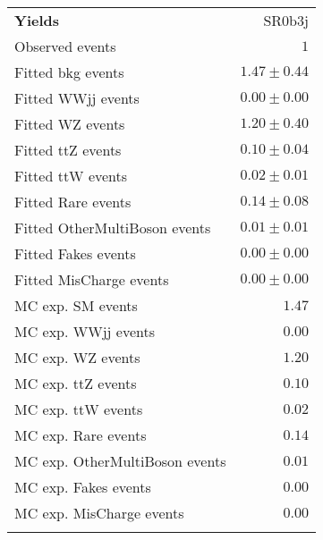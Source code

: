 \begin{table}
\begin{center}
\setlength{\tabcolsep}{0.0pc}
{\small
\begin{tabular*}{\textwidth}{@{\extracolsep{\fill}}lr}
\noalign{\smallskip}\hline\noalign{\smallskip}
\noalign{\smallskip}\hline\noalign{\smallskip}
{\bf Yields}           & SR0b3j              \\[-0.05cm]
\noalign{\smallskip}\hline\noalign{\smallskip}
Observed events          & $1$                    \\
\noalign{\smallskip}\hline\noalign{\smallskip}
Fitted bkg events         & $1.47 \pm 0.44$              \\
\noalign{\smallskip}\hline\noalign{\smallskip}
        Fitted WWjj events         & $0.00 \pm 0.00$              \\
        Fitted WZ events         & $1.20 \pm 0.40$              \\
        Fitted ttZ events         & $0.10 \pm 0.04$              \\
        Fitted ttW events         & $0.02 \pm 0.01$              \\
        Fitted Rare events         & $0.14 \pm 0.08$              \\
        Fitted OtherMultiBoson events         & $0.01 \pm 0.01$              \\
        Fitted Fakes events         & $0.00 \pm 0.00$              \\
        Fitted MisCharge events         & $0.00 \pm 0.00$              \\
 \noalign{\smallskip}\hline\noalign{\smallskip}
MC exp. SM events              & $1.47$              \\
\noalign{\smallskip}\hline\noalign{\smallskip}
        MC exp. WWjj events         & $0.00$              \\
        MC exp. WZ events         & $1.20$              \\
        MC exp. ttZ events         & $0.10$              \\
        MC exp. ttW events         & $0.02$              \\
        MC exp. Rare events         & $0.14$              \\
        MC exp. OtherMultiBoson events         & $0.01$              \\
        MC exp. Fakes events         & $0.00$              \\
        MC exp. MisCharge events         & $0.00$              \\
\noalign{\smallskip}\hline\noalign{\smallskip}
\end{tabular*}
}


\end{center}
\end{table}
